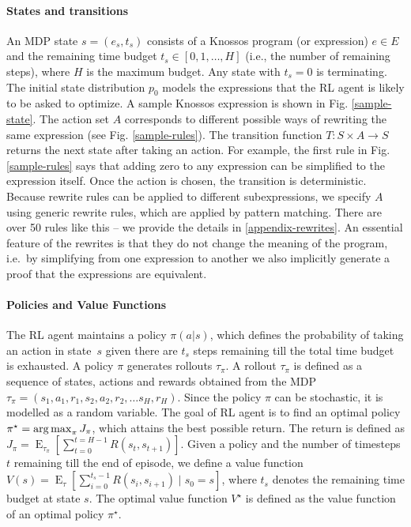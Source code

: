 \documentclass[fullpage,twocolumn]{article} %
\newcommand{\Exp}{\operatorname{E}}
\begin{document}
\paragraph{States and transitions}
An MDP state $s=(e_s,t_s)$ consists of a Knossos program (or expression) $e\in E$ and the remaining time budget $t_s\in[0, 1,\ldots, H]$ (i.e., the number of remaining  steps), where $H$ is the maximum budget. Any state with $t_s=0$ is terminating. The initial state distribution $p_0$ models the expressions that the RL agent is likely to be asked to optimize. A sample Knossos expression is shown in Fig. \ref{sample-state}. The action set $A$ corresponds to different possible ways of rewriting the same expression (see Fig. \ref{sample-rules}). The transition function $T:S\times A\rightarrow S$ returns the next state after taking an action.
For example, the first rule in Fig. \ref{sample-rules} says that adding zero to any expression can be simplified to the expression itself. Once the action is chosen, the transition is deterministic. Because rewrite rules can be applied to different subexpressions, we specify $A$ using generic rewrite rules, which are applied by pattern matching.
%
There are over 50 rules like this -- we provide the details in \ref{appendix-rewrites}. An essential feature of the rewrites is that they do not change the meaning of the program, i.e.\ by simplifying from one expression to another we also implicitly generate a proof that the expressions are equivalent. 

\paragraph{Policies and Value Functions} The RL agent maintains a policy $\pi(a \vert s)$, which defines the probability of taking an action in state~$s$ given there are $t_s$ steps remaining till the total time budget is exhausted. A policy $\pi$ generates rollouts $\tau_\pi$. A rollout $\tau_\pi$ is defined as a sequence of states, actions and rewards obtained from the MDP $\tau_\pi = \left( s_1, a_1, r_1, s_2, a_2, r_2, \dots s_H, r_H \right )$. Since the policy $\pi$ can be stochastic, it is modelled as a random variable. The goal of RL agent is to find an optimal policy $\pi^\star = \operatorname*{arg\,max}_\pi J_\pi$, which attains the best possible return. The return is defined as $J_\pi =  \Exp_{\tau_\pi} \left[ \sum_{t=0}^{t={H-1}} R(s_t, s_{t+1}) \right] $. Given a policy and the number of timesteps $t$ remaining till the end of episode, we define a value function $V(s) = \Exp_{\tau} \left[ \sum_{i=0}^{t_s-1} R(s_i, s_{i+1}) \; \Big\vert \; s_0 = s\right]$, where $t_s$ denotes the remaining time budget at state $s$. The optimal value function $V^\star$ is defined as the value function of an optimal policy $\pi^\star$.
\end{document}
